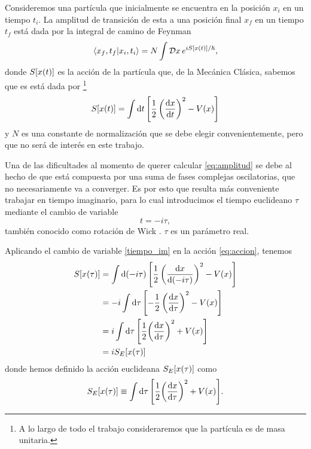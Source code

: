 Consideremos una partícula que inicialmente se encuentra en la posición $x_i$ en un tiempo $t_i$. La amplitud de transición de esta a una posición final $x_f$ en un tiempo $t_f$ está dada por la integral de camino de Feynman \cite{feynman2010quantum}
\begin{equation}\label{eq:amplitud}
\bra{x_f, t_f}\ket{x_i, t_i} = N \int \mathcal{D}x \, e^{iS\qty[x \qty(t)]/\hbar},
\end{equation}
donde $S\qty[x \qty(t)]$ es la acción de la partícula que, de la Mecánica Clásica, sabemos que es está dada por \footnote{A lo largo de todo el trabajo consideraremos que la partícula es de masa unitaria. 
}
\begin{equation}
S\qty[x \qty(t)] = \int \dd{t} \qty[\frac{1}{2} \left(\dv{x}{t}\right)^2 - V\qty(x)] \label{eq:accion}
\end{equation}
y $N$ es una constante de normalización que se debe elegir convenientemente, pero que no será de interés en este trabajo. 

Una de las dificultades al momento de querer calcular \eqref{eq:amplitud} se debe al hecho de que está compuesta por una suma de fases complejas oscilatorias, que no necesariamente va a converger. Es por esto que resulta más conveniente trabajar en tiempo imaginario, para lo cual introducimos el tiempo euclideano $\tau$ mediante el cambio de variable
\begin{equation}
	t = -i\tau, \label{tiempo_im}
\end{equation} 
también conocido como rotación de Wick \cite{das2006field}. $\tau$ es un parámetro real. 

Aplicando el cambio de variable \eqref{tiempo_im} en la acción \eqref{eq:accion}, tenemos
\begin{align}
S\qty[x\qty(\tau)] &= \int \dd{\qty(-i\tau)} \qty[ \frac{1}{2} \left(\dv{x}{\qty(-i\tau)}\right)^2 - V(x)] \\
&= -i\int \dd{\tau} \qty[ -\frac{1}{2} \left(\dv{x}{\tau}\right)^2 - V\qty(x)] \\ 
&= i \int \dd{\tau} \qty[ \frac{1}{2}\qty(\dv{x}{\tau})^2 + V(x)] \\
&= iS_E\qty[x\qty(\tau)] \label{eq:S_s_e}
\end{align}
donde hemos definido la acción euclideana $S_E\qty[x\qty(\tau)]$ como 
\begin{equation}\label{eq:eucliaction}
S_E\qty[x\qty(\tau)] \equiv \int \dd{\tau} \qty[ \frac{1}{2}\qty(\dv{x}{\tau})^2 + V(x)].
\end{equation}

